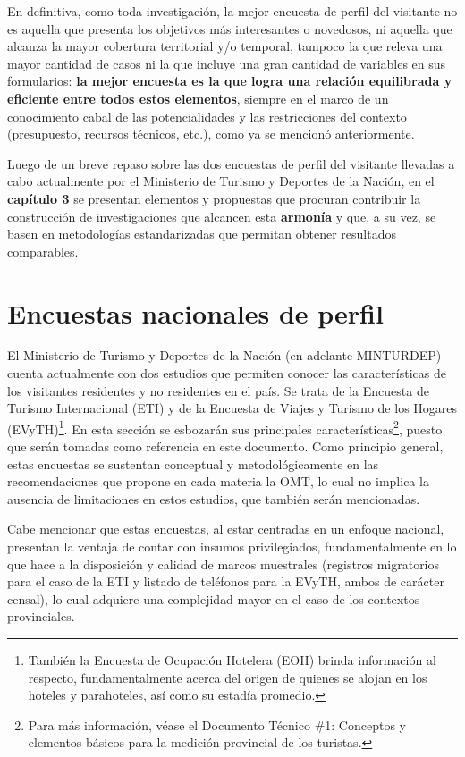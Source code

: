 \documentclass[
]{book}
\begin{document}
En definitiva, como toda investigación, la mejor encuesta de perfil del visitante no es aquella que presenta los objetivos más interesantes o novedosos, ni aquella que alcanza la mayor cobertura territorial y/o temporal, tampoco la que releva una mayor cantidad de casos ni la que incluye una gran cantidad de variables en sus formularios: \textbf{la mejor encuesta es la que logra una relación equilibrada y eficiente entre todos estos elementos}, siempre en el marco de un conocimiento cabal de las potencialidades y las restricciones del contexto (presupuesto, recursos técnicos, etc.), como ya se mencionó anteriormente.

Luego de un breve repaso sobre las dos encuestas de perfil del visitante llevadas a cabo actualmente por el Ministerio de Turismo y Deportes de la Nación, en el \textbf{capítulo 3} se presentan elementos y propuestas que procuran contribuir la construcción de investigaciones que alcancen esta \textbf{armonía} y que, a su vez, se basen en metodologías estandarizadas que permitan obtener resultados comparables.

\hypertarget{encuestas-nacionales-de-perfil}{%
\chapter{\texorpdfstring{\textbf{Encuestas nacionales de perfil}}{Encuestas nacionales de perfil}}\label{encuestas-nacionales-de-perfil}}

El Ministerio de Turismo y Deportes de la Nación (en adelante MINTURDEP) cuenta actualmente con dos estudios que permiten conocer las características de los visitantes residentes y no residentes en el país. Se trata de la Encuesta de Turismo Internacional (ETI) y de la Encuesta de Viajes y Turismo de los Hogares (EVyTH)\footnote{También la Encuesta de Ocupación Hotelera (EOH) brinda información al respecto, fundamentalmente acerca del origen de quienes se alojan en los hoteles y parahoteles, así como su estadía promedio.}. En esta sección se esbozarán sus principales características\footnote{Para más información, véase el Documento Técnico \#1: Conceptos y elementos básicos para la medición provincial de los turistas.}, puesto que serán tomadas como referencia en este documento. Como principio general, estas encuestas se sustentan conceptual y metodológicamente en las recomendaciones que propone en cada materia la OMT, lo cual no implica la ausencia de limitaciones en estos estudios, que también serán mencionadas.

Cabe mencionar que estas encuestas, al estar centradas en un enfoque nacional, presentan la ventaja de contar con insumos privilegiados, fundamentalmente en lo que hace a la disposición y calidad de marcos muestrales (registros migratorios para el caso de la ETI y listado de teléfonos para la EVyTH, ambos de carácter censal), lo cual adquiere una complejidad mayor en el caso de los contextos provinciales.
\end{document}
